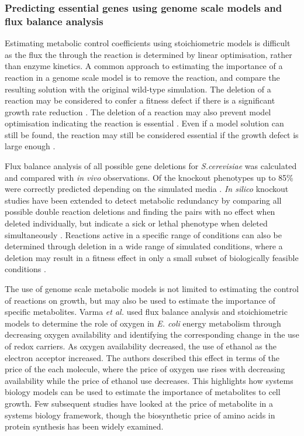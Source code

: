 \subsubsection{Predicting essential genes using genome scale models and flux balance analysis}%

Estimating metabolic control coefficients using stoichiometric models is difficult as the flux the through the reaction is determined by linear optimisation, rather than enzyme kinetics. A common approach to estimating the importance of a reaction in a genome scale model is to remove the reaction, and compare the resulting solution with the original wild-type simulation. The deletion of a reaction may be considered to confer a fitness defect if there is a significant growth rate reduction \cite{pal2006}. The deletion of a reaction may also prevent model optimisation indicating the reaction is essential \cite{becker2008}.  Even if a model solution can still be found, the reaction may still be considered essential if the growth defect is large enough \cite{papp2004,wang2009}.

Flux balance analysis of all possible gene deletions for \emph{S.cerevisiae} was calculated and compared with \emph{in vivo} observations. Of the knockout phenotypes up to 85\% were correctly predicted depending on the simulated media \cite{famili2003,forster2003}. \emph{In silico} knockout studies have been extended to detect metabolic redundancy by comparing all possible double reaction deletions and finding the pairs with no effect when deleted individually, but indicate a sick or lethal phenotype when deleted simultaneously \cite{harrison2007}. Reactions active in a specific range of conditions can also be determined through deletion in a wide range of simulated conditions, where a deletion may result in a fitness effect in only a small subset of biologically feasible conditions \cite{papp2004}.

The use of genome scale metabolic models is not limited to estimating the control of reactions on growth, but may also be used to estimate the importance of specific metabolites. Varma \emph{et al.} \cite{varma1993} used flux balance analysis and stoichiometric models to determine the role of oxygen in \emph{E. coli} energy metabolism through decreasing oxygen availability and identifying the corresponding change in the use of redox carriers. As oxygen availability decreased, the use of ethanol as the electron acceptor increased. The authors described this effect in terms of the price of the each molecule, where the price of oxygen use rises with decreasing availability while the price of ethanol use decreases. This highlights how systems biology models can be used to estimate the importance of metabolites to cell growth. Few subsequent studies have looked at the price of metabolite in a systems biology framework, though the biosynthetic price of amino acids in protein synthesis has been widely examined.

